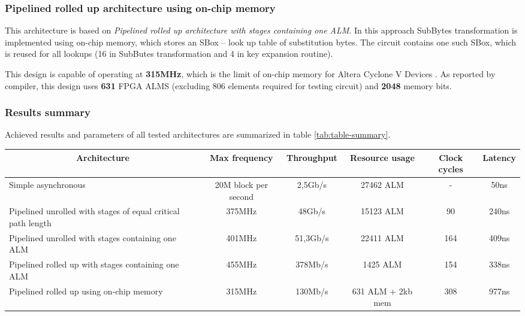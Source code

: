 \subsubsection{Pipelined rolled up architecture using on-chip memory}

This architecture is based on \textit {Pipelined rolled up architecture with stages containing one ALM}. In this approach SubBytes transformation is implemented using on-chip memory, which stores an SBox -- look up table of substitution bytes. The circuit contains one such SBox, which is reused for all lookups (16 in SubButes transformation and 4 in key expansion routine).

This design is capable of operating at \textbf{315MHz}, which is the limit of on-chip memory for Altera Cyclone V Devices \cite[Table 27]{cycloneVDatasheet}. As reported by compiler, this design uses \textbf{631} FPGA ALMS (excluding 806 elements required for testing circuit) and \textbf{2048} memory bits.

\subsubsection{Results summary}

Achieved results and parameters of all tested architectures are summarized in table \ref{tab:table-summary}.

\begin{sidewaystable}[!h]
\centering
\begin{tabular}{|l|c|c|c|c|c|}
	\hline 
	\multicolumn{1}{|c|}{\bfseries Architecture} & 
	\multicolumn{1}{c|}{\bfseries Max frequency} & 
	\multicolumn{1}{c|}{\bfseries Throughput} & 
	\multicolumn{1}{c|}{\bfseries Resource usage} & 
	\multicolumn{1}{c|}{\bfseries Clock cycles} & 
	\multicolumn{1}{c|}{\bfseries Latency} \\

	\hline 
	Simple asynchronous & 20M block per second & 2,5Gb/s & 27462 ALM & - & 50ns \\
	\hline 
	Pipelined unrolled with stages of equal critical path length & 375MHz & 48Gb/s & 15123 ALM & 90 & 240ns \\
	\hline 
	Pipelined unrolled with stages containing one ALM & 401MHz & 51,3Gb/s & 22411 ALM & 164 & 409ns \\
	\hline 
	Pipelined rolled up with stages containing one ALM & 455MHz & 378Mb/s & 1425 ALM & 154 & 338ns \\
	\hline 
	Pipelined rolled up using on-chip memory & 315MHz & 130Mb/s & 631 ALM + 2kb mem & 308 & 977ns \\
	\hline 
\end{tabular}
\caption{\label{tab:table-summary}Results summary}
\end{sidewaystable}

